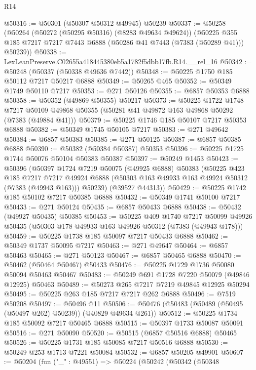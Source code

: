 \begin{lexlean}{R14}
\begin{coremodule}
@50316 := @50301 (@50307 @50312 @49945) @50239
@50337 := @50258
    (@50264
      (@50272 (@50295 @50316) (@8283 @49634 @49624))
      (@50225 @355 @185 @7217 @7217 @7443 @6888 (@50286 @41 @7443 (@7383 (@50289 @41))) @50239))
@50338 := LexLeanPreserve.C02655a418445380eb5a1782f5dbb17fb.R14.__rel_16
@50342 := @50248 (@50337 (@50338 @49636 @7442))
@50348 := @50225 @1750 @185 @50112 @7217 @50217 @6888
@50349 := @50265 @465
@50352 := @50349 @1749 @50110 @7217
@50353 := @271 @50126
@50355 := @6857 @50353 @6888
@50358 := @50352 (@49869 @50355) @50217
@50373 := @50225
    @1722
    @1748
    @7217
    @50109
    @49868
    @50355
    (@50281 @41 @49872 @163 @49868 @50292 (@7383 (@49884 @41)))
@50379 := @50225 @1746 @185 @50107 @7217 @50353 @6888
@50382 := @50349 @1745 @50105 @7217
@50383 := @271 @49642
@50384 := @6857 @50383
@50385 := @271 @50125
@50387 := @6857 @50385 @6888
@50390 := @50382 (@50384 @50387) @50353
@50396 := @50225 @1725 @1744 @50076 @50104 @50383 @50387
@50397 := @50249 @1453
@50423 := @50396
    (@50397
      @1724
      @7219
      @50075
      (@49925 @6888)
      @50383
      (@50225
        @423
        @185
        @7217
        @7217
        @49924
        @6888
        (@50303 @163 @49933 @163 @49924 @50312 (@7383 (@49943 @163)))
        @50239)
      (@39527 @44313))
@50429 := @50225 @1742 @185 @50102 @7217 @50385 @6888
@50432 := @50349 @1741 @50100 @7217
@50433 := @271 @50124
@50435 := @6857 @50433 @6888
@50438 := @50432 (@49927 @50435) @50385
@50453 := @50225
    @409
    @1740
    @7217
    @50099
    @49926
    @50435
    (@50303 @178 @49933 @163 @49926 @50312 (@7383 (@49943 @178)))
@50459 := @50225 @1738 @185 @50097 @7217 @50433 @6888
@50462 := @50349 @1737 @50095 @7217
@50463 := @271 @49647
@50464 := @6857 @50463
@50465 := @271 @50123
@50467 := @6857 @50465 @6888
@50470 := @50462 (@50464 @50467) @50433
@50476 := @50225 @1729 @1736 @50080 @50094 @50463 @50467
@50483 := @50249 @691 @1728 @7220 @50079 (@49846 @12925) @50463
@50489 := @50273 @265 @7217 @7219 @49845 @12925 @50294
@50495 := @50225 @263 @185 @7217 @7217 @262 @6888
@50496 := @7519 @50208
@50497 := @50496 @11
@50506 := @50476 (@50483 (@50489 (@50495 (@50497 @262) @50239)) (@40829 @49634 @261))
@50512 := @50225 @1734 @185 @50092 @7217 @50465 @6888
@50515 := @50397 @1733 @50087 @50091
@50516 := @271 @50090
@50520 := @50515 (@6857 @50516 @6888) @50465
@50526 := @50225 @1731 @185 @50085 @7217 @50516 @6888
@50530 := @50249 @253 @1713 @7221 @50084
@50532 := @6857 @50205 @49901
@50607 := @50204
    (fun ("_" : @49551) =>
    @50224
      (@50242
        (@50342
          (@50348

\end{coremodule}
\end{lexlean}
